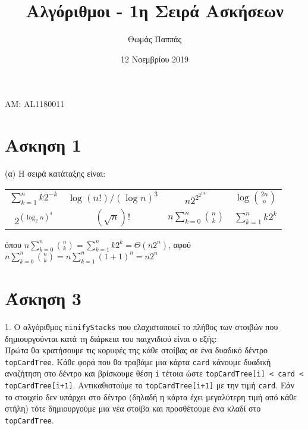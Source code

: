 \documentclass[a4paper,11pt]{article}
\begin{document}
\title{Αλγόριθμοι - 1η Σειρά Ασκήσεων}
\author{Θωμάς Παππάς}
\date{12 Νοεμβρίου 2019}
\maketitle
\begin{center}ΑΜ: AL1180011\end{center}

\section*{Ασκηση 1}
(α) Η σειρά κατάταξης είναι:
\begin{center}
\begin{tabular}{ c c c c }
$\sum_{k=1}^nk2^{-k}$ & $\log{(n!)}/(\log{n})^3$ & $n2^{2^{2^{100}}}$ & $\log{2n\choose n}$ \\
$2^{(\log_2n)^4}$ & $(\sqrt{n})!$ & $n\sum_{k=0}^n{n\choose k}$ & $\sum_{k=1}^nk2^k$ \\
\end{tabular}
\end{center}
όπου $n\sum_{k=0}^n{n\choose k} = \sum_{k=1}^nk2^k = \Theta(n2^n)$, αφού $n\sum_{k=0}^n{n\choose k} = n\sum_{k=1}^n(1+1)^n = n2^n$

%
%
%
%

\section*{Άσκηση 3}
1. Ο αλγόριθμος \verb|minifyStacks| που ελαχιστοποιεί το πλήθος των στοιβών που δημιουργούνται κατά τη διάρκεια του παιχνιδιού είναι ο εξής:\\
Πρώτα θα κρατήσουμε τις κορυφές της κάθε στοίβας σε ένα δυαδικό δέντρο \verb|topCardTree|. Κάθε φορά που θα τραβάμε μια κάρτα \verb|card| κάνουμε δυαδική αναζήτηση στο δέντρο και βρίσκουμε θέση \verb|i| τέτοια ώστε \verb|topCardTree[i] < card < topCardTree[i+1]|. Αντικαθιστούμε το \verb|topCardTree[i+1]| με την τιμή \verb|card|. Εάν το στοιχείο δεν υπάρχει στο δέντρο (δηλαδή η κάρτα έχει μεγαλύτερη τιμή από κάθε στήλη) τότε δημιουργούμε μια νέα στοίβα και προσθέτουμε ένα κλαδί στο \verb|topCardTree|.
\end{document}
